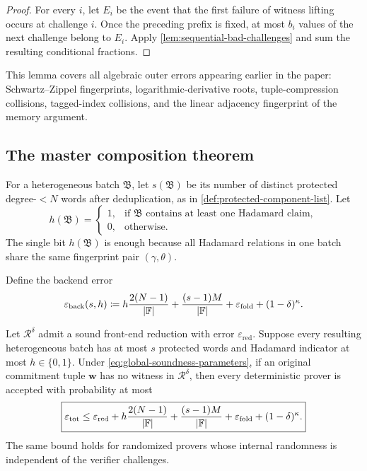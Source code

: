 \begin{proof}
For every $i$, let $E_i$ be the event that the first failure of witness lifting occurs at challenge $i$.  Once the preceding prefix is fixed, at most $b_i$ values of the next challenge belong to $E_i$.  Apply \cref{lem:sequential-bad-challenges} and sum the resulting conditional fractions.
\end{proof}

This lemma covers all algebraic outer errors appearing earlier in the paper: Schwartz--Zippel fingerprints, logarithmic-derivative roots, tuple-compression collisions, tagged-index collisions, and the linear adjacency fingerprint of the memory argument.

\subsection{The master composition theorem}
\label{sec:master-soundness-composition}

For a heterogeneous batch $\mathfrak B$, let $s(\mathfrak B)$ be its number of distinct protected degree-$<N$ words after deduplication, as in \cref{def:protected-component-list}.  Let
\[
  h(\mathfrak B)
  =
  \begin{cases}
    1,&\text{if }\mathfrak B\text{ contains at least one Hadamard claim},\\
    0,&\text{otherwise.}
  \end{cases}
\]
The single bit $h(\mathfrak B)$ is enough because all Hadamard relations in one batch share the same fingerprint pair $(\gamma,\theta)$.

Define the backend error
\begin{equation}
  \varepsilon_{\mathrm{back}}(s,h)
  \coloneqq
  h\frac{2(N-1)}{|\mathbb{F}|}
  +\frac{(s-1)M}{|\mathbb{F}|}
  +\varepsilon_{\mathrm{fold}}
  +(1-\delta)^\kappa.
  \label{eq:global-backend-error}
\end{equation}

\begin{theorem}
\label{thm:master-interactive-soundness}
Let $\mathcal R^\delta$ admit a sound front-end reduction with error $\varepsilon_{\mathrm{red}}$.  Suppose every resulting heterogeneous batch has at most $s$ protected words and Hadamard indicator at most $h\in\{0,1\}$.  Under \eqref{eq:global-soundness-parameters}, if an original commitment tuple $\mathbf w$ has no witness in $\mathcal R^\delta$, then every deterministic prover is accepted with probability at most
\begin{equation}
  \boxed{
  \varepsilon_{\mathrm{tot}}
  \le
  \varepsilon_{\mathrm{red}}
  +h\frac{2(N-1)}{|\mathbb{F}|}
  +\frac{(s-1)M}{|\mathbb{F}|}
  +\varepsilon_{\mathrm{fold}}
  +(1-\delta)^\kappa.}
  \label{eq:master-total-soundness}
\end{equation}
The same bound holds for randomized provers whose internal randomness is independent of the verifier challenges.
\end{theorem}

